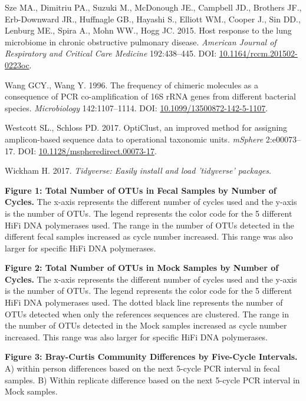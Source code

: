 \documentclass[12pt,]{article}
\begin{document}
\hypertarget{ref-Sze2015}{}
Sze MA., Dimitriu PA., Suzuki M., McDonough JE., Campbell JD., Brothers
JF., Erb-Downward JR., Huffnagle GB., Hayashi S., Elliott WM., Cooper
J., Sin DD., Lenburg ME., Spira A., Mohn WW., Hogg JC. 2015. Host
response to the lung microbiome in chronic obstructive pulmonary
disease. \emph{American Journal of Respiratory and Critical Care
Medicine} 192:438--445. DOI:
\href{https://doi.org/10.1164/rccm.201502-0223oc}{10.1164/rccm.201502-0223oc}.

\hypertarget{ref-Wang1996}{}
Wang GCY., Wang Y. 1996. The frequency of chimeric molecules as a
consequence of PCR co-amplification of 16S rRNA genes from different
bacterial species. \emph{Microbiology} 142:1107--1114. DOI:
\href{https://doi.org/10.1099/13500872-142-5-1107}{10.1099/13500872-142-5-1107}.

\hypertarget{ref-opticlust_Westcott_2017}{}
Westcott SL., Schloss PD. 2017. OptiClust, an improved method for
assigning amplicon-based sequence data to operational taxonomic units.
\emph{mSphere} 2:e00073--17. DOI:
\href{https://doi.org/10.1128/mspheredirect.00073-17}{10.1128/mspheredirect.00073-17}.

\hypertarget{ref-tidyverse_2017}{}
Wickham H. 2017. \emph{Tidyverse: Easily install and load 'tidyverse'
packages}.

\newpage

\textbf{Figure 1: Total Number of OTUs in Fecal Samples by Number of
Cycles.} The x-axis represents the different number of cycles used and
the y-axis is the number of OTUs. The legend represents the color code
for the 5 different HiFi DNA polymerases used. The range in the number
of OTUs detected in the different fecal samples increased as cycle
number increased. This range was also larger for specific HiFi DNA
polymerases.

\textbf{Figure 2: Total Number of OTUs in Mock Samples by Number of
Cycles.} The x-axis represents the different number of cycles used and
the y-axis is the number of OTUs. The legend represents the color code
for the 5 different HiFi DNA polymerases used. The dotted black line
represents the number of OTUs detected when only the references
sequences are clustered. The range in the number of OTUs detected in the
Mock samples increased as cycle number increased. This range was also
larger for specific HiFi DNA polymerases.

\textbf{Figure 3: Bray-Curtis Community Differences by Five-Cycle
Intervals.} A) within person differences based on the next 5-cycle PCR
interval in fecal samples. B) Within replicate difference based on the
next 5-cycle PCR interval in Mock samples.
\end{document}
